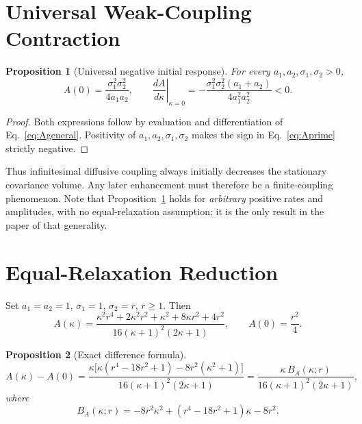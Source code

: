 \documentclass[11pt]{article}
\theoremstyle{plain}
\newtheorem{proposition}{Proposition}
\theoremstyle{remark}
\begin{document}
\section{Universal Weak-Coupling Contraction}

\begin{proposition}[Universal negative initial response]\label{prop:Aprime}
For every $a_1,a_2,\sigma_1,\sigma_2>0$,
\begin{equation}
  A(0)=\frac{\sigma_1^2\sigma_2^2}{4a_1a_2},
  \qquad
  \left.\frac{dA}{d\kappa}\right|_{\kappa=0}
  =-\frac{\sigma_1^2\sigma_2^2(a_1+a_2)}{4a_1^2a_2^2}<0. \label{eq:Aprime}
\end{equation}
\end{proposition}

\begin{proof}
Both expressions follow by evaluation and differentiation of Eq.~\eqref{eq:Ageneral}.
Positivity of $a_1,a_2,\sigma_1,\sigma_2$ makes the sign in Eq.~\eqref{eq:Aprime} strictly
negative.
\end{proof}

Thus infinitesimal diffusive coupling always initially decreases the stationary covariance
volume. Any later enhancement must therefore be a finite-coupling phenomenon. Note that
Proposition~\ref{prop:Aprime} holds for \emph{arbitrary} positive rates and amplitudes, with no
equal-relaxation assumption; it is the only result in the paper of that generality.

\section{Equal-Relaxation Reduction}\label{sec:modes}

Set $a_1=a_2=1$, $\sigma_1=1$, $\sigma_2=r$, $r\ge1$. Then
\begin{equation}
  A(\kappa)=\frac{\kappa^2r^4+2\kappa^2r^2+\kappa^2+8\kappa r^2+4r^2}
                 {16(\kappa+1)^2(2\kappa+1)},
  \qquad
  A(0)=\frac{r^2}{4}. \label{eq:Aequal}
\end{equation}

\begin{proposition}[Exact difference formula]\label{prop:diff}
\begin{equation}
  A(\kappa)-A(0)
  =\frac{\kappa\bigl[\kappa(r^4-18r^2+1)-8r^2(\kappa^2+1)\bigr]}
        {16(\kappa+1)^2(2\kappa+1)}
  =\frac{\kappa\,B_A(\kappa;r)}{16(\kappa+1)^2(2\kappa+1)}, \label{eq:diff}
\end{equation}
where
\begin{equation}
  B_A(\kappa;r)=-8r^2\kappa^2+(r^4-18r^2+1)\kappa-8r^2. \label{eq:BA}
\end{equation}
\end{proposition}
\end{document}

